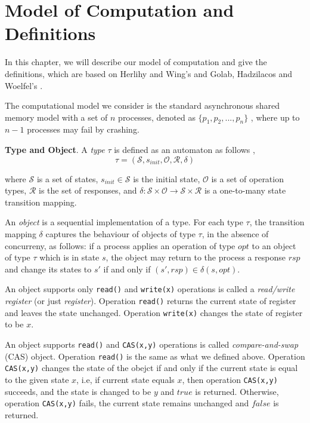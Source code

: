 
\chapter{Model of Computation and Definitions}
In this chapter, we will describe our model of computation and give the definitions, which are based on Herlihy
and Wing's \cite{Herlihy:1990:LCC:78969.78972} and Golab, Hadzilacos and Woelfel's \cite{InProc-GHHW2007a}.

The computational model we consider is the standard asynchronous shared memory model with a set of $n$ processes,
denoted as $\{p_1, p_2,...,p_n\}$ , where up to $n-1$ processes may fail by crashing.


\textbf{Type and Object}.
A \emph{type} $\tau$ is defined as an automaton as follows \cite{InProc-GHHW2007a},
$$\tau = (\mathcal{S}, s_{init},\mathcal{O},\mathcal{R} ,\delta )$$

where $\mathcal{S}$ is a set of states, $s_{init} \in \mathcal{S}$ is the initial state, $\mathcal{O}$ is a set of
operation types, $\mathcal{R}$ is the set of responses, and
$\delta :\mathcal{S} \times \mathcal{O} \to \mathcal{S} \times \mathcal{R}$ is a one-to-many state transition mapping.

An \emph{object} is a sequential implementation of a type. For each type $\tau$, the transition mapping $\delta$ captures the
behaviour of objects of type $\tau$, in the absence of concurreny,
as follows: if a process applies an operation of type $opt$ to an object of type $\tau$ which is in state $s$, the object
may return to the process a response $rsp$ and change its states to $s'$ if and only if $(s', rsp) \in \delta(s, opt)$.

An object supports only \texttt{read()} and \texttt{write(x)} operations is called a \emph{read/write register}
(or just \emph{register}). Operation \texttt{read()} returns the current state of register and leaves the state unchanged.
Operation \texttt{write(x)} changes the state of register to be $x$.

An object supports \texttt{read()} and \texttt{CAS(x,y)} operations is called \emph{compare-and-swap} (CAS) object.
Operation \texttt{read()} is the same as what we defined above. Operation \texttt{CAS(x,y)} changes the state of
the obejct if and only if the current state is equal to the given state $x$, i.e,
if current state equals $x$, then operation \texttt{CAS(x,y)} succeeds, and the state is changed
to be $y$ and $true$ is returned. Otherwise, operation \texttt{CAS(x,y)} fails, the current state remains unchanged and
$false$ is returned.

